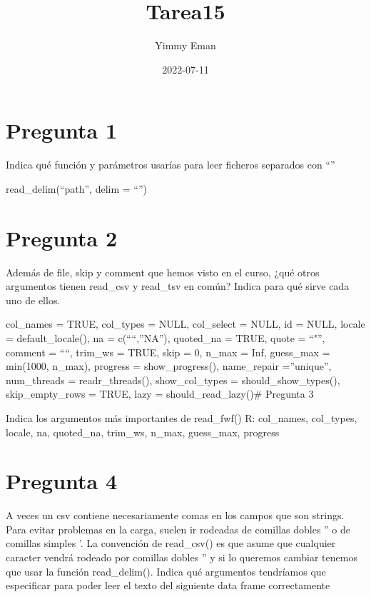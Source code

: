 \documentclass[
]{article}
\title{Tarea15}
\author{Yimmy Eman}
\date{2022-07-11}
\begin{document}
\maketitle

\hypertarget{pregunta-1}{%
\section{Pregunta 1}\label{pregunta-1}}

Indica qué función y parámetros usarías para leer ficheros separados con
``\textbar{}''

read\_delim(``path'', delim = ``\textbar{}'')

\hypertarget{pregunta-2}{%
\section{Pregunta 2}\label{pregunta-2}}

Además de file, skip y comment que hemos visto en el curso, ¿qué otros
argumentos tienen read\_csv y read\_tsv en común? Indica para qué sirve
cada uno de ellos.

col\_names = TRUE, col\_types = NULL, col\_select = NULL, id = NULL,
locale = default\_locale(), na = c(````,''NA''), quoted\_na = TRUE,
quote = ``"'', comment = ````, trim\_ws = TRUE, skip = 0, n\_max = Inf,
guess\_max = min(1000, n\_max), progress = show\_progress(),
name\_repair =''unique'', num\_threads = readr\_threads(),
show\_col\_types = should\_show\_types(), skip\_empty\_rows = TRUE, lazy
= should\_read\_lazy()\# Pregunta 3

Indica los argumentos más importantes de read\_fwf() R: col\_names,
col\_types, locale, na, quoted\_na, trim\_ws, n\_max, guess\_max,
progress

\hypertarget{pregunta-4}{%
\section{Pregunta 4}\label{pregunta-4}}

A veces un csv contiene necesariamente comas en los campos que son
strings. Para evitar problemas en la carga, suelen ir rodeadas de
comillas dobles '' o de comillas simples '. La convención de read\_csv()
es que asume que cualquier caracter vendrá rodeado por comillas dobles
'' y si lo queremos cambiar tenemos que usar la función read\_delim().
Indica qué argumentos tendríamos que especificar para poder leer el
texto del siguiente data frame correctamente
\end{document}
